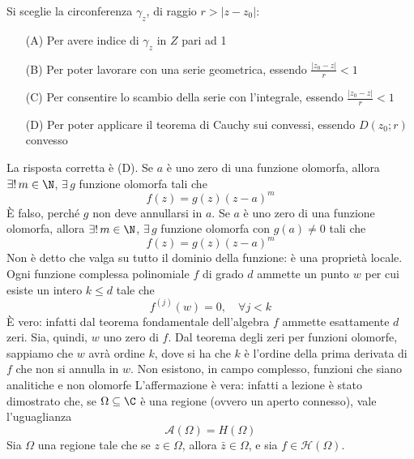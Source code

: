     Si sceglie la circonferenza $\gamma_z$, di raggio $r > |z - z_0|$: \begin{enumerate}
        \item[(A)] Per avere indice di $\gamma_z$ in $Z$ pari ad 1
        \item[(B)] Per poter lavorare con una serie geometrica, essendo $ \frac{|z_0 - z|}{r} < 1$
        \item[(C)] Per consentire lo scambio della serie con l'integrale, essendo $ \frac{|z_0 - z|}{r} < 1$
        \item[(D)] Per poter applicare il teorema di Cauchy sui convessi, essendo $D(z_0 ; r)$ convesso
    \end{enumerate}
    La risposta corretta è (D).
    Se $a$ è uno zero di una funzione olomorfa, allora $\exists!\, m \in \N$, $ \exists\, g$ funzione olomorfa tali che \[
        f(z) = g(z)(z-a)^m
    \]
    È falso, perché $ g $ non deve annullarsi in $ a $.
    Se $a$ è uno zero di una funzione olomorfa, allora $\exists!\, m \in \N$, $ \exists\, g$ funzione olomorfa con $ g(a)\neq 0 $ tali che \[
        f(z) = g(z)(z-a)^m
    \]
    Non è detto che valga su tutto il dominio della funzione: è una proprietà locale. 
    Ogni funzione complessa polinomiale $f$ di grado $d$ ammette un punto $w$ per cui esiste un intero $k \le  d$ tale che \[
        f^{(j)}(w) = 0, \quad \forall j < k
    \]
    È vero: infatti dal teorema fondamentale dell'algebra $f$ ammette esattamente $d$ zeri. Sia, quindi, $w$ uno zero di $f$. Dal teorema degli zeri per funzioni olomorfe, sappiamo che $w$ avrà ordine $k$, dove si ha che $k$ è l'ordine della prima derivata di $f$ che non si annulla in $w$.
    Non esistono, in campo complesso, funzioni che siano analitiche e non olomorfe
    L'affermazione è vera: infatti a lezione è stato dimostrato che, se $ \Omega \subseteq \C $ è una regione (ovvero un aperto connesso), vale l'uguaglianza \[
        \mathcal{A}(\Omega) = H(\Omega)
    \]
    Sia $\Omega$ una regione tale che se $z \in \Omega$, allora $\bar{z} \in \Omega$, e sia $f \in \mathcal{H}(\Omega)$.
    
